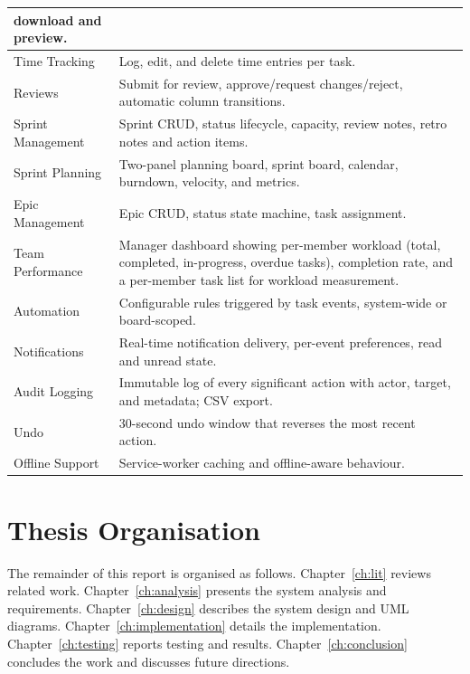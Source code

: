 \documentclass[12pt,a4paper]{report}
\begin{document}
\begin{longtable}{|p{4.5cm}|p{11.5cm}|}
download and preview. \\
\hline
Time Tracking & Log, edit, and delete time entries per task. \\
\hline
Reviews & Submit for review, approve/request changes/reject, automatic column
transitions. \\
\hline
Sprint Management & Sprint CRUD, status lifecycle, capacity, review notes,
retro notes and action items. \\
\hline
Sprint Planning & Two-panel planning board, sprint board, calendar, burndown,
velocity, and metrics. \\
\hline
Epic Management & Epic CRUD, status state machine, task assignment. \\
\hline
Team Performance & Manager dashboard showing per-member workload (total,
completed, in-progress, overdue tasks), completion rate, and a per-member task
list for workload measurement. \\
\hline
Automation & Configurable rules triggered by task events, system-wide or
board-scoped. \\
\hline
Notifications & Real-time notification delivery, per-event preferences, read
and unread state. \\
\hline
Audit Logging & Immutable log of every significant action with actor, target,
and metadata; CSV export. \\
\hline
Undo & 30-second undo window that reverses the most recent action. \\
\hline
Offline Support & Service-worker caching and offline-aware behaviour. \\
\hline
\end{longtable}

\section{Thesis Organisation}
The remainder of this report is organised as follows. Chapter~\ref{ch:lit} reviews
related work. Chapter~\ref{ch:analysis} presents the system analysis and
requirements. Chapter~\ref{ch:design} describes the system design and UML
diagrams. Chapter~\ref{ch:implementation} details the implementation.
Chapter~\ref{ch:testing} reports testing and results. Chapter~\ref{ch:conclusion}
concludes the work and discusses future directions.

\end{document}
